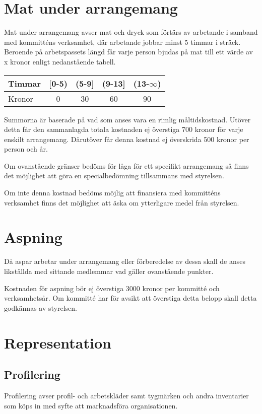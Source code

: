\documentclass[11pt, includeaddress]{../../classes/cthit}
\begin{document}
\section{Mat under arrangemang}
Mat under arrangemang avser mat och dryck som förtärs av arbetande i samband med kommitténs verksamhet, där arbetande jobbar minst 5 timmar i sträck. Beroende på arbetspassets längd får varje person bjudas på mat till ett värde av x kronor enligt nedanstående tabell.

\begin{table}[h]
\centering
\begin{tabular}{ l  c  c  c  c}
	Timmar & [0-5) & (5-9] & (9-13] & (13-$\infty$) \\
	\hline
	Kronor & 0 & 30 & 60 & 90 \\
\end{tabular}
\end{table}

Summorna är baserade på vad som anses vara en rimlig måltidskostnad. Utöver detta får den sammanlagda totala kostnaden ej överstiga 700 kronor för varje enskilt arrangemang. Därutöver får denna kostnad ej överskrida 500 kronor per person och år. 

Om ovanstående gränser bedöms för låga för ett specifikt arrangemang så finns det möjlighet att göra en specialbedömning tillsammans med styrelsen. 

Om inte denna kostnad bedöms möjlig att finansiera med kommitténs verksamhet finns det möjlighet att äska om ytterligare medel från styrelsen. 

\section{Aspning}
Då aspar arbetar under arrangemang eller förberedelse av dessa skall de anses likställda med sittande medlemmar vad gäller ovanstående punkter. 

Kostnaden för aspning bör ej överstiga 3000 kronor per kommitté och verksamhetsår. Om kommitté har för avsikt att överstiga detta belopp skall detta godkännas av styrelsen.

\section{Representation}

\subsection{Profilering}
Profilering avser profil- och arbetskläder samt tygmärken och andra inventarier som köps in med syfte att marknadsföra organisationen. 
\end{document}
